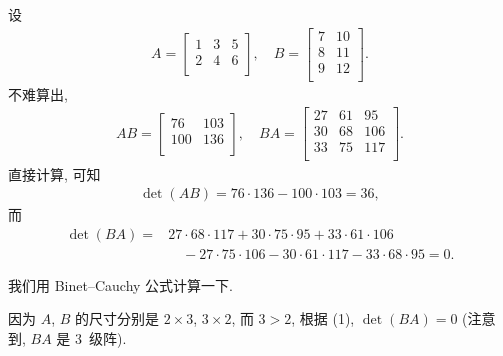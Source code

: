 \documentclass[%
    UTF8,%
    fontset=none,%
    punct=kaiming,%
    zihao=-4,%
    a4paper,%
    oneside,%
]{ctexbook}
\begin{document}
\begin{example}
    设
    \begin{align*}
        A =
        \begin{bmatrix}
            1 & 3 & 5 \\
            2 & 4 & 6 \\
        \end{bmatrix},
        \quad
        B =
        \begin{bmatrix}
            7 & 10 \\
            8 & 11 \\
            9 & 12 \\
        \end{bmatrix}.
    \end{align*}
    不难算出,
    \begin{align*}
        AB =
        \begin{bmatrix}
            76  & 103 \\
            100 & 136 \\
        \end{bmatrix},
        \quad
        BA =
        \begin{bmatrix}
            27 & 61 & 95  \\
            30 & 68 & 106 \\
            33 & 75 & 117 \\
        \end{bmatrix}.
    \end{align*}
    直接计算, 可知
    \begin{align*}
        \det {(AB)} = 76 \cdot 136 - 100 \cdot 103 = 36,
    \end{align*}
    而
    \begin{align*}
        \det {(BA)}
        = {} &
        27 \cdot 68 \cdot 117
        + 30 \cdot 75 \cdot 95
        + 33 \cdot 61 \cdot 106
        \\
             & \quad
        - 27 \cdot 75 \cdot 106
        - 30 \cdot 61 \cdot 117
        - 33 \cdot 68 \cdot 95
        = 0.
    \end{align*}

    我们用 Binet--Cauchy 公式计算一下.

    因为 \(A\), \(B\) 的尺寸分别是 \(2 \times 3\), \(3 \times 2\),
    而 \(3 > 2\),
    根据 (1), \(\det {(BA)} = 0\)
    (注意到, \(BA\) 是 \(3\)~级阵).


\end{example}
\end{document}
